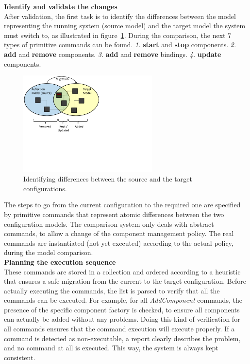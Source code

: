 {\bf Identify and validate the changes} \\
After validation, the first task is to identify the differences between the model representing the running system (source model) and the target model the system must switch to, as illustrated in figure~\ref{figure:comparison}. During the comparison, the next 7 types of primitive commands can be found. \textit{1.} {\bf start} and {\bf stop} components. \textit{2.} {\bf add} and {\bf remove} components. \textit{3.} {\bf add} and {\bf remove} bindings. \textit{4.} {\bf update} components.
\begin{figure}
\begin{center}
\includegraphics[width=7cm]{part2/pics/comparison}
\caption{\label{figure:comparison} Identifying differences between the source and the target configurations.}
\end{center}
\end{figure}
The steps to go from the current configuration to the required one are specified by primitive commands that represent atomic differences between the two configuration models.
The comparison system only deals with abstract commands, to allow a change of the component management policy. The real commands are instantiated (not yet executed) according to the actual policy, during the model comparison.\\

{\bf Planning the execution sequence}\\
These commands are stored in a collection and ordered according to a heuristic~\cite{Andre:2010} that ensures a safe migration from the current to the target configuration. Before actually executing the commands, the list is parsed to verify that all the commands can be executed. For example, for all {\it AddComponent} commands, the presence of the specific component factory is checked, to ensure all components can actually be added without any problems. Doing this kind of verification for all commands ensures that the command execution will execute properly. If a command is detected as non-executable, a report clearly describes the problem, and no command at all is executed. This way, the system is always kept consistent.\\

